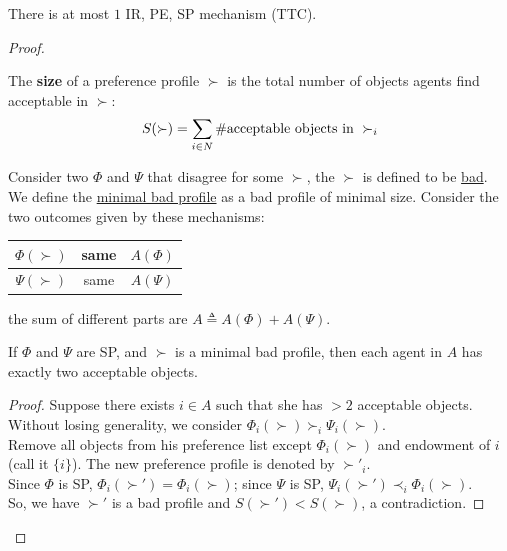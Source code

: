 \documentclass[11pt]{elegantbook}
\begin{document}
\begin{theorem}
    There is at most $1$ IR, PE, SP mechanism (TTC).
\end{theorem}
\begin{proof}
    \begin{definition}
        \normalfont
        The \textbf{size} of a preference profile $\succ$ is the total number of objects agents find acceptable in $\succ$:
        \begin{equation}
            \begin{aligned}
                S(\succ)=\sum_{i\in N}\# \textnormal{acceptable objects in }\succ_i
            \end{aligned}
            \nonumber
        \end{equation}
    \end{definition}
    Consider two $\Phi$ and $\Psi$ that disagree for some $\succ$, the $\succ$ is defined to be \underline{bad}.\\
    We define the \underline{minimal bad profile} as a bad profile of minimal size.
    Consider the two outcomes given by these mechanisms:
    \begin{center}
        \begin{tabular}{ccc}
            \hline
                $\Phi(\succ)$&\textnormal{same} & $A(\Phi)$\\
            \hline
                $\Psi(\succ)$&\textnormal{same} & $A(\Psi)$\\
            \hline
        \end{tabular}
    \end{center}
    the sum of different parts are $A\triangleq A(\Phi)+A(\Psi)$.
    \begin{lemma}
        If $\Phi$ and $\Psi$ are SP, and $\succ$ is a minimal bad profile, then each agent in $A$ has exactly two acceptable objects.
    \end{lemma}
    \begin{proof}
        Suppose there exists $i\in A$ such that she has $>2$ acceptable objects.\\
        Without losing generality, we consider $\Phi_i(\succ)\succ_i\Psi_i(\succ)$.\\
        Remove all objects from his preference list except $\Phi_i(\succ)$ and endowment of $i$ (call it $\{i\}$). The new preference profile is denoted by $\succ'_i$.\\
        Since $\Phi$ is SP, $\Phi_i(\succ')=\Phi_i(\succ)$; since $\Psi$ is SP, $\Psi_i(\succ')\prec_i\Phi_i(\succ)$.\\
        So, we have $\succ'$ is a bad profile and $S(\succ')<S(\succ)$, a contradiction.
    \end{proof}
\end{proof}
\end{document}
